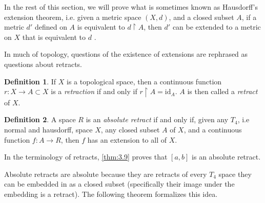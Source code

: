 \documentclass[openany, amssymb, psamsfonts]{amsart}
\let\fullref\autoref
\theoremstyle{definition}
\newtheorem{defn}{Definition}[section]
\numberwithin{equation}{section}
\begin{document}
In the rest of this section, we will prove what is sometimes known as Hausdorff's extension theorem, i.e. given a metric space $(X,d)$, and a closed subset $A$, if a metric $d'$ defined on $A$ is equivalent to $d\restriction A$, then $d'$ can be extended to a metric on $X$ that is equivalent to $d$ \cite{hausdorff}. 

In much of topology, questions of the existence of extensions are rephrased as questions about retracts.

\begin{defn}
  If $X$ is a topological space, then a continuous function $r: X \to A \subset X$ is a \emph{retraction} if and only if $r \restriction A = \mathrm{id}_A$. $A$ is then called a \emph{retract} of $X$. 
\end{defn}
\begin{defn}
  A space $R$ is an \emph{absolute retract} if and only if, given any $T_4$, i.e normal and hausdorff, space $X$, any closed subset $A$ of $X$, and a continuous function $f: A \to R$, then $f$ has an extension to all of $X$.
\end{defn}
In the terminology of retracts, \fullref{thm:3.9} proves that $[a,b]$ is an absolute retract.

Absolute retracts are absolute because they are retracts of every $T_4$ space they can be embedded in as a closed subset (specifically their image under the embedding is a retract). The following theorem formalizes this idea.
\end{document}
